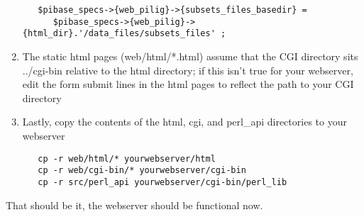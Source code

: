 \documentclass[11pt]{article}
\begin{document}
\begin{enumerate}
\begin{verbatim}
   $pibase_specs->{web_pilig}->{subsets_files_basedir} =
      $pibase_specs->{web_pilig}->{html_dir}.'/data_files/subsets_files' ;
\end{verbatim}

\item The static html pages (web/html/*.html) assume that the CGI directory sits ../cgi-bin relative to the html directory; if this isn't true for your webserver, edit the form submit lines in the html pages to reflect the path to your CGI directory

\item Lastly, copy the contents of the html, cgi, and perl\_api directories to your webserver
\begin{verbatim}
   cp -r web/html/* yourwebserver/html
   cp -r web/cgi-bin/* yourwebserver/cgi-bin
   cp -r src/perl_api yourwebserver/cgi-bin/perl_lib
\end{verbatim}
\end{enumerate}

That should be it, the webserver should be functional now.
\end{document}

